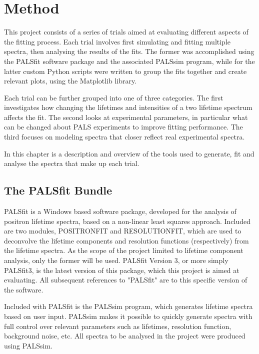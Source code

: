 \chapter{Method}

This project consists of a series of trials aimed at evaluating different aspects of the fitting process. Each trial involves first simulating and fitting multiple spectra, then analysing the results of the fits. The former was accomplished using the PALSfit software package and the associated PALSsim program, while for the latter custom Python scripts were written to group the fits together and create relevant plots, using the Matplotlib library.

Each trial can be further grouped into one of three categories. The first investigates how changing the lifetimes and intensities of a two lifetime spectrum affects the fit. The second looks at experimental parameters, in particular what can be changed about PALS experiments to improve fitting performance. The third focuses on modeling spectra that closer reflect real experimental spectra.

In this chapter is a description and overview of the tools used to generate, fit and analyse the spectra that make up each trial.

\section{The PALSfit Bundle}

PALSfit is a Windows based software package, developed for the analysis of positron lifetime spectra, based on a non-linear least squares approach. Included are two modules, POSITRONFIT and RESOLUTIONFIT, which are used to deconvolve the lifetime components and resolution functions (respectively) from the lifetime spectra. As the scope of the project limited to lifetime component analysis, only the former will be used. PALSfit Version 3, or more simply PALSfit3, is the latest version of this package, which this project is aimed at evaluating. All subsequent references to "PALSfit" are to this specific version of the software.

Included with PALSfit is the PALSsim program, which generates lifetime spectra based on user input. PALSsim makes it possible to quickly generate spectra with full control over relevant parameters such as lifetimes, resolution function, background noise, etc. All spectra to be analysed in the project were produced using PALSsim.

